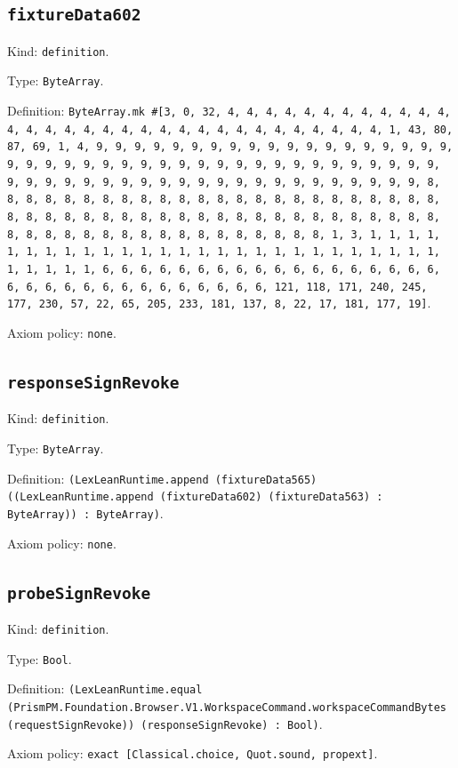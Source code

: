 \documentclass[11pt]{article}
\begin{document}
\subsection*{\texttt{fixtureData602}}
\noindent Kind: \texttt{definition}.\par
\noindent Type: \texttt{ByteArray}.\par
\noindent Definition: \texttt{ByteArray.mk \#[3, 0, 32, 4, 4, 4, 4, 4, 4, 4, 4, 4, 4, 4, 4, 4, 4, 4, 4, 4, 4, 4, 4, 4, 4, 4, 4, 4, 4, 4, 4, 4, 4, 4, 4, 1, 43, 80, 87, 69, 1, 4, 9, 9, 9, 9, 9, 9, 9, 9, 9, 9, 9, 9, 9, 9, 9, 9, 9, 9, 9, 9, 9, 9, 9, 9, 9, 9, 9, 9, 9, 9, 9, 9, 9, 9, 9, 9, 9, 9, 9, 9, 9, 9, 9, 9, 9, 9, 9, 9, 9, 9, 9, 9, 9, 9, 9, 9, 9, 9, 9, 9, 9, 9, 9, 9, 8, 8, 8, 8, 8, 8, 8, 8, 8, 8, 8, 8, 8, 8, 8, 8, 8, 8, 8, 8, 8, 8, 8, 8, 8, 8, 8, 8, 8, 8, 8, 8, 8, 8, 8, 8, 8, 8, 8, 8, 8, 8, 8, 8, 8, 8, 8, 8, 8, 8, 8, 8, 8, 8, 8, 8, 8, 8, 8, 8, 8, 8, 8, 8, 1, 3, 1, 1, 1, 1, 1, 1, 1, 1, 1, 1, 1, 1, 1, 1, 1, 1, 1, 1, 1, 1, 1, 1, 1, 1, 1, 1, 1, 1, 1, 1, 1, 1, 6, 6, 6, 6, 6, 6, 6, 6, 6, 6, 6, 6, 6, 6, 6, 6, 6, 6, 6, 6, 6, 6, 6, 6, 6, 6, 6, 6, 6, 6, 6, 6, 121, 118, 171, 240, 245, 177, 230, 57, 22, 65, 205, 233, 181, 137, 8, 22, 17, 181, 177, 19]}.\par
\noindent Axiom policy: \texttt{none}.\par
\subsection*{\texttt{responseSignRevoke}}
\noindent Kind: \texttt{definition}.\par
\noindent Type: \texttt{ByteArray}.\par
\noindent Definition: \texttt{(LexLeanRuntime.append (fixtureData565) ((LexLeanRuntime.append (fixtureData602) (fixtureData563) : ByteArray)) : ByteArray)}.\par
\noindent Axiom policy: \texttt{none}.\par
\subsection*{\texttt{probeSignRevoke}}
\noindent Kind: \texttt{definition}.\par
\noindent Type: \texttt{Bool}.\par
\noindent Definition: \texttt{(LexLeanRuntime.equal (PrismPM.Foundation.Browser.V1.WorkspaceCommand.workspaceCommandBytes (requestSignRevoke)) (responseSignRevoke) : Bool)}.\par
\noindent Axiom policy: \texttt{exact [Classical.choice, Quot.sound, propext]}.\par
\end{document}
